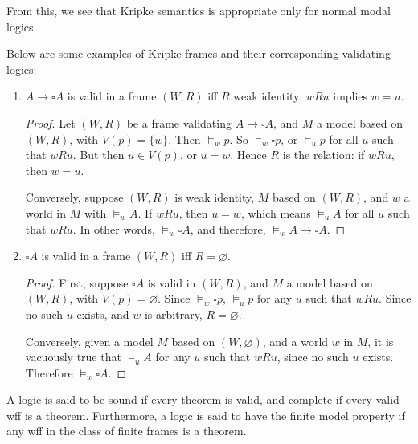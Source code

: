 \documentclass[12pt]{article}
\begin{document}
From this, we see that Kripke semantics is appropriate only for normal modal logics.

Below are some examples of Kripke frames and their corresponding validating logics:
\begin{enumerate}
\item $A \to \square A$ is valid in a frame $(W,R)$ iff $R$ weak identity: $w R u$ implies $w=u$.
\begin{proof}  Let $(W,R)$ be a frame validating $A \to \square A$, and $M$ a model based on $(W,R)$, with $V(p)=\lbrace w \rbrace$.  Then $\models_w p$.  So $\models_w \square p$, or $\models_u p$ for all $u$ such that $w R u$.  But then $u\in V(p)$, or $u=w$.  Hence $R$ is the relation: if $w R u$, then $w=u$.

Conversely, suppose $(W,R)$ is weak identity, $M$ based on $(W,R)$, and $w$ a world in $M$ with $\models_w A$.  If $w R u$, then $u=w$, which means $\models_u A$ for all $u$ such that $w R u$.  In other words, $\models_w \square A$, and therefore, $\models_w A\to \square A$.
\end{proof}
\item $\square A$ is valid in a frame $(W,R)$ iff $R=\varnothing$.
\begin{proof}  First, suppose $\square A$ is valid in $(W,R)$, and $M$ a model based on $(W,R)$, with $V(p)=\varnothing$.  Since $\models_w \square p$, $\models_u p$ for any $u$ such that $w R u$.  Since no such $u$ exists, and $w$ is arbitrary, $R=\varnothing$.

Conversely, given a model $M$ based on $(W,\varnothing)$, and a world $w$ in $M$, it is vacuously true that $\models_u A$ for any $u$ such that $w R u$, since no such $u$ exists.  Therefore $\models_w \square A$.
\end{proof}
\end{enumerate}

A logic is said to be sound if every theorem is valid, and complete if every valid wff is a theorem.  Furthermore, a logic is said to have the finite model property if any wff in the class of finite frames is a theorem.

\end{document}

